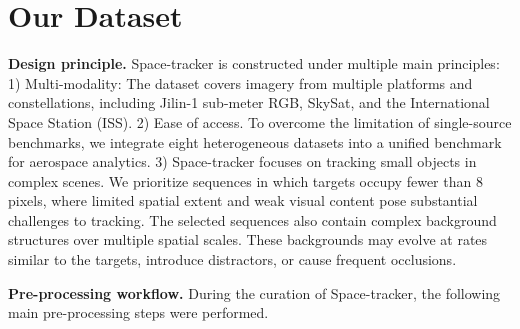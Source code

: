 \documentclass{article}
\begin{document}
\section{Our Dataset}
\label{sec:dataset}
\noindent\textbf{Design principle.}
Space-tracker is constructed under multiple main principles:  1) Multi-modality: The dataset covers imagery from multiple platforms and constellations, including Jilin-1 sub-meter RGB, SkySat, and the International Space Station (ISS). %
2) Ease of access. To overcome the limitation of single-source benchmarks, we integrate eight heterogeneous datasets into a unified benchmark for aerospace analytics. 3) Space-tracker focuses on tracking small objects in complex scenes. We prioritize sequences in which targets occupy fewer than 8 pixels, where
limited spatial extent and weak visual content pose substantial challenges to tracking. The selected sequences also contain complex background structures over multiple spatial scales. These backgrounds may evolve at rates similar to the targets, introduce distractors, or cause frequent occlusions. %

\noindent\textbf{Pre-processing workflow.} During the curation of Space-tracker, the following main pre-processing steps were performed.
\end{document}
